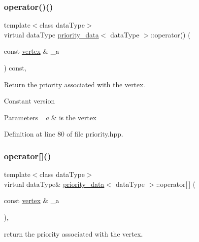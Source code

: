 \subsubsection{\texorpdfstring{operator()()}{operator()()}}
{\footnotesize\ttfamily template$<$class data\+Type$>$ \\
virtual data\+Type \hyperlink{structpriority__data}{priority\+\_\+data}$<$ data\+Type $>$\+::operator() (\begin{DoxyParamCaption}\item[{const \hyperlink{graph_8hpp_abefdcf0544e601805af44eca032cca14}{vertex} \&}]{\+\_\+a }\end{DoxyParamCaption}) const\hspace{0.3cm}{\ttfamily [inline]}, {\ttfamily [virtual]}}



Return the priority associated with the vertex. 

Constant version 
\begin{DoxyParams}{Parameters}
{\em \+\_\+a} & is the vertex \\
\hline
\end{DoxyParams}


Definition at line 80 of file priority.\+hpp.

\mbox{\label{structpriority__data_a0fde9994cb5f749b6dbedc1df4be363d}} 
\subsubsection{\texorpdfstring{operator[]()}{operator[]()}}
{\footnotesize\ttfamily template$<$class data\+Type$>$ \\
virtual data\+Type\& \hyperlink{structpriority__data}{priority\+\_\+data}$<$ data\+Type $>$\+::operator\mbox{[}$\,$\mbox{]} (\begin{DoxyParamCaption}\item[{const \hyperlink{graph_8hpp_abefdcf0544e601805af44eca032cca14}{vertex} \&}]{\+\_\+a }\end{DoxyParamCaption})\hspace{0.3cm}{\ttfamily [inline]}, {\ttfamily [virtual]}}



return the priority associated with the vertex. 

